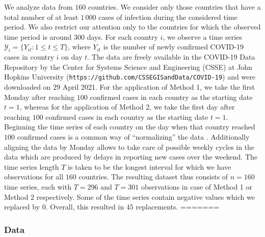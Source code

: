 \documentclass[a4paper,12pt]{article}
\numberwithin{equation}{section}
\begin{document}
We analyze data from $160$ countries. We consider only those countries that have a total number of at least $1\,000$ cases of infection during the considered time period. We also restrict our attention only to the countries for which the observed time period is around $300$ days. For each country $i$, we observe a time series $\mathcal{Y}_i = \{ Y_{it}: 1 \le t \le T \}$, where $Y_{it}$ is the number of newly confirmed COVID-19 cases in country $i$ on day $t$. The data are freely available in the COVID-19 Data Repository by the Center for Systems Science and Engineering (CSSE) at John Hopkins University (\texttt{https://github.com/CSSEGISandData/COVID-19}) and were downloaded on 29 April 2021. For the application of Method 1, we take the first Monday after reaching $100$ confirmed cases in each country as the starting date $t=1$, whereas for the application of Method 2, we take the first day after reaching $100$ confirmed cases in each country as the starting date $t=1$.
Beginning the time series of each country on the day when that country reached $100$ confirmed cases is a common way of ``normalizing'' the data \citep[see e.g.][]{Cohen2020}. Additionally aligning the data by Monday allows to take care of possible weekly cycles in the data which are produced by delays in reporting new cases over the weekend. 
The time series length $T$ is taken to be the longest interval for which we have observations for all $160$ countries. The resulting dataset thus consists of $n = 160$ time series, each with $T = 296$ and $T = 301$ observations in case of Method 1 or Method 2 respectively. Some of the time series contain negative values which we replaced by $0$. Overall, this resulted in $45$ replacements.
=======
\subsubsection{Data}
\end{document}
